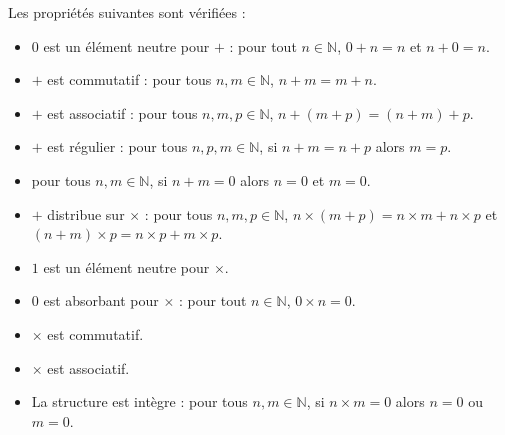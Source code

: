 \begin{property}
  Les propriétés suivantes sont vérifiées :
  \begin{itemize}
  \item $0$ est un élément neutre pour $+$ : pour tout $n\in \mathbb N$,
    $0 + n = n$ et $n + 0 = n$.
  \item $+$ est commutatif : pour tous $n,m\in\mathbb N$, $n+m=m+n$.
  \item $+$ est associatif : pour tous $n,m,p\in\mathbb N$,
    $n+(m+p) = (n+m)+p$.
  \item $+$ est régulier : pour tous $n,p,m\in\mathbb N$, si $n+m = n+p$ alors
    $m=p$.
  \item pour tous $n,m\in \mathbb N$, si $n + m = 0$ alors $n=0$ et $m = 0$.
  \item $+$ distribue sur $\times$ : pour tous $n,m,p\in\mathbb N$,
    $n\times(m+p) = n\times m + n \times p$ et
    $(n+m)\times p = n\times p + m \times p$.
  \item $1$ est un élément neutre pour $\times$.
  \item $0$ est absorbant pour $\times$ : pour tout $n\in \mathbb N$,
    $0\times n = 0$.
  \item $\times$ est commutatif.
  \item $\times$ est associatif.
  \item La structure est intègre : pour tous $n,m\in \mathbb N$, si
    $n\times m = 0$ alors $n = 0$ ou $m = 0$.
  \end{itemize}
\end{property}

